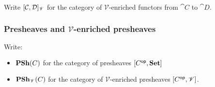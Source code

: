 \begin{definition}
Write $[\mathcal{C},\mathcal{D}]_{\mathscr{V}}$ for the category of $\mathscr{V}$-enriched functors from
$\cat{C}$ to $\cat{D}$.
\end{definition}

\subsubsection{Presheaves and $\mathscr{V}$-enriched presheaves}

Write:
\begin{itemize}
\item $\mathbf{PSh}(C)$ for the category of presheaves $[C^{\mathsf{op}},\mathbf{Set}]$
\item $\mathbf{PSh}_{\mathscr{V}}(C)$ for the category of $\mathscr{V}$-enriched presheaves
$[C^{\mathsf{op}},\mathscr{V}]$.
\end{itemize}
